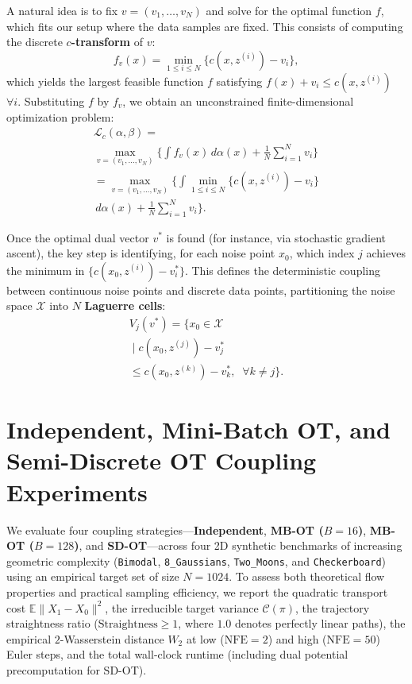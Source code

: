 A natural idea is to fix $v = (v_1, \dots, v_N)$ and solve for the optimal function $f$, which fits our setup where the data samples are fixed. This consists of computing the discrete \textbf{$c$-transform} of $v$:
\begin{equation}
    f_v(x) = \min_{1 \le i \le N} \big\{ c(x, z^{(i)}) - v_i \big\},
\end{equation}
which yields the largest feasible function $f$ satisfying $f(x) + v_i \le c(x, z^{(i)})$ $\forall i$. Substituting $f$ by $f_v$, we obtain an unconstrained finite-dimensional optimization problem:
\begin{multline}
    \mathcal{L}_c(\alpha, \beta) = \\
        \max_{v = (v_1, \dots, v_N)} \bigl\{ \int f_v(x) \, d\alpha(x) + \frac{1}{N} \sum_{i = 1}^N v_i \bigr\} \\
        = \max_{v = (v_1, \dots, v_N)} \bigl\{ \int \min_{1 \le i \le N} \big\{ c(x, z^{(i)}) - v_i \big\} \\
        \, d\alpha(x) + \frac{1}{N} \sum_{i = 1}^N v_i \bigr\}.
\end{multline}

Once the optimal dual vector $v^*$ is found (for instance, via stochastic gradient ascent), the key step is identifying, for each noise point $x_0$, which index $j$ achieves the minimum in $\{c(x_0, z^{(i)}) - v_i^*\}$. This defines the deterministic coupling between continuous noise points and discrete data points, partitioning the noise space $\mathcal{X}$ into $N$ \textbf{Laguerre cells}:
\begin{multline}
    V_j(v^*) = \bigl\{ x_0 \in \mathcal{X} \\
        \;\big|\; c(x_0, z^{(j)}) - v_j^* \\
        \le c(x_0, z^{(k)}) - v_k^*, \;\; \forall k \neq j \bigr\}.
\end{multline}


\section{Independent, Mini-Batch OT, and Semi-Discrete OT Coupling Experiments}
\label{sec:experiments}

We evaluate four coupling strategies---\textbf{Independent}, \textbf{MB-OT ($B=16$)}, \textbf{MB-OT ($B=128$)}, and \textbf{SD-OT}---across four 2D synthetic benchmarks of increasing geometric complexity (\texttt{Bimodal}, \texttt{8\_Gaussians}, \texttt{Two\_Moons}, and \texttt{Checkerboard}) using an empirical target set of size $N = 1024$. To assess both theoretical flow properties and practical sampling efficiency, we report the quadratic transport cost $\mathbb{E}\|X_1 - X_0\|^2$, the irreducible target variance $\mathcal{C}(\pi)$, the trajectory straightness ratio ($\text{Straightness} \ge 1$, where $1.0$ denotes perfectly linear paths), the empirical $2$-Wasserstein distance $W_2$ at low ($\text{NFE}=2$) and high ($\text{NFE}=50$) Euler steps, and the total wall-clock runtime (including dual potential precomputation for SD-OT).

